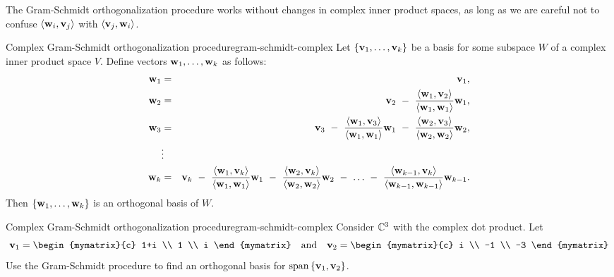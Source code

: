 The Gram-Schmidt orthogonalization procedure works without changes in
complex inner product spaces, as long as we are careful not to confuse
$\iprod{\vect{w}_i,\vect{v}_j}$ with $\iprod{\vect{v}_j,\vect{w}_i}$.

\begin{proposition}{Complex Gram-Schmidt orthogonalization procedure}{gram-schmidt-complex}
  Let $\set{\vect{v}_1,\ldots,\vect{v}_k}$ be a basis for some subspace $W$
  of a complex inner product space $V$.%
  Define vectors
  $\vect{w}_1,\ldots,\vect{w}_k$ as follows:
  \begin{eqnarray*}
    \vect{w}_1
    &=& \vect{v}_1,
    \\
    \vect{w}_2
    &=& \vect{v}_2
        ~-~ \frac{\iprod{\vect{w}_1,\vect{v}_2}}{\iprod{\vect{w}_1,\vect{w}_1}}\vect{w}_1,
    \\
    \vect{w}_3
    &=& \vect{v}_3
        ~-~ \frac{\iprod{\vect{w}_1,\vect{v}_3}}{\iprod{\vect{w}_1,\vect{w}_1}}\vect{w}_1
        ~-~ \frac{\iprod{\vect{w}_2,\vect{v}_3}}{\iprod{\vect{w}_2,\vect{w}_2}}\vect{w}_2,
    \\
    &\vdots&
    \\
    \vect{w}_k
    &=& \vect{v}_k
        ~-~ \frac{\iprod{\vect{w}_1,\vect{v}_k}}{\iprod{\vect{w}_1,\vect{w}_1}}\vect{w}_1
        ~-~ \frac{\iprod{\vect{w}_2,\vect{v}_k}}{\iprod{\vect{w}_2,\vect{w}_2}}\vect{w}_2
        ~-~ \ldots
        ~-~ \frac{\iprod{\vect{w}_{k-1},\vect{v}_k}}{\iprod{\vect{w}_{k-1},\vect{w}_{k-1}}}\vect{w}_{k-1}.
  \end{eqnarray*}
  Then $\set{\vect{w}_1,\ldots,\vect{w}_k}$ is an orthogonal basis of $W$.
\end{proposition}

\begin{example}{Complex Gram-Schmidt orthogonalization procedure}{gram-schmidt-complex}
  Consider $\mathbb{C}^3$ with the complex dot product. Let
  \begin{equation*}
    \vect{v}_1 = \begin{mymatrix}{c} 1+i \\ 1 \\ i \end{mymatrix}
    \quad\mbox{and}\quad
    \vect{v}_2 = \begin{mymatrix}{c} i \\ -1 \\ -3  \end{mymatrix}
  \end{equation*}
  Use the Gram-Schmidt procedure to find an orthogonal basis for
  $\sspan\set{\vect{v}_1,\vect{v}_2}$.
\end{example}

